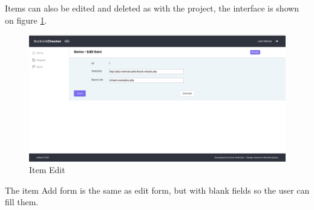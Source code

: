 Items can also be edited and deleted as with the project, the interface is shown on figure \ref{img:edititem}.
\begin{figure}[H]
	\caption{Item Edit}
	\label{img:edititem}
	\includegraphics[width=\textwidth]{images/items_edit}
\end{figure}

The item Add form is the same as edit form, but with blank fields so the user can fill them.
